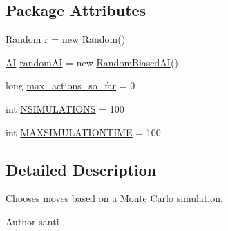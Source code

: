 \subsection*{Package Attributes}
\begin{DoxyCompactItemize}
\item 
Random \hyperlink{classai_1_1montecarlo_1_1_monte_carlo_afe972f6e13fe999090cadd591be22419}{r} = new Random()
\item 
\hyperlink{classai_1_1_a_i}{AI} \hyperlink{classai_1_1montecarlo_1_1_monte_carlo_a787e4ffe12e97749660eaa73bffcc17b}{randomAI} = new \hyperlink{classai_1_1_random_biased_a_i}{RandomBiasedAI}()
\item 
long \hyperlink{classai_1_1montecarlo_1_1_monte_carlo_a3f850dcb2986b28372c775f4c4f200a1}{max\_\-actions\_\-so\_\-far} = 0
\item 
int \hyperlink{classai_1_1montecarlo_1_1_monte_carlo_a43072c462191f467fc3e28034398558e}{NSIMULATIONS} = 100
\item 
int \hyperlink{classai_1_1montecarlo_1_1_monte_carlo_a20c7b3de1a2ba1d635f5bf612e55386b}{MAXSIMULATIONTIME} = 100
\end{DoxyCompactItemize}


\subsection{Detailed Description}
Chooses moves based on a Monte Carlo simulation. 

\begin{DoxyAuthor}{Author}
santi 
\end{DoxyAuthor}


